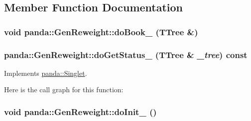 \subsection{Member Function Documentation}
\hypertarget{classpanda_1_1GenReweight_aab268ef7f69fc6069828c22cc5eae282}{
\subsubsection[{doBook\_\-}]{\setlength{\rightskip}{0pt plus 5cm}void panda::GenReweight::doBook\_\- (TTree \&)}}
\label{classpanda_1_1GenReweight_aab268ef7f69fc6069828c22cc5eae282}
\hypertarget{classpanda_1_1GenReweight_a0d5945a3b2fd8aba14d8259a3dc36e97}{
\subsubsection[{doGetStatus\_\-}]{ panda::GenReweight::doGetStatus\_\- (TTree \& {\em \_\-tree}) const}}
\label{classpanda_1_1GenReweight_a0d5945a3b2fd8aba14d8259a3dc36e97}


Implements \hyperlink{classpanda_1_1Singlet_ad2749c2f28a2970eda99db906a116881}{panda::Singlet}.

Here is the call graph for this function:\hypertarget{classpanda_1_1GenReweight_a0b244ad39f5b2143524a3375f4a7c726}{
\subsubsection[{doInit\_\-}]{\setlength{\rightskip}{0pt plus 5cm}void panda::GenReweight::doInit\_\- ()}}
\label{classpanda_1_1GenReweight_a0b244ad39f5b2143524a3375f4a7c726}


